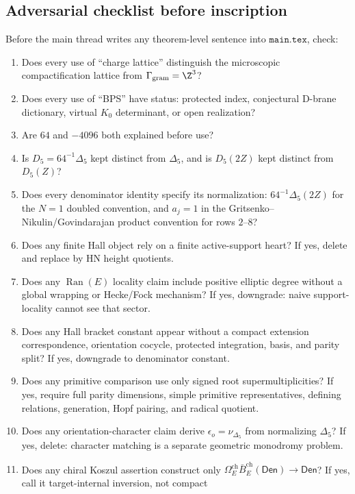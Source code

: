 \subsection{Adversarial checklist before inscription}

Before the main thread writes any theorem-level sentence into
\(\texttt{main.tex}\), check:
\begin{enumerate}
\item Does every use of ``charge lattice'' distinguish the microscopic
compactification lattice from \(\Gamma_{\mathrm{gram}}=\Z^3\)?
\item Does every use of ``BPS'' have status: protected index,
conjectural D-brane dictionary, virtual \(K_0\) determinant, or open
realization?
\item Are \(64\) and \(-4096\) both explained before use?
\item Is \(D_5=64^{-1}\Delta_5\) kept distinct from
\(\Delta_5\), and is \(D_5(2Z)\) kept distinct from \(D_5(Z)\)?
\item Does every denominator identity specify its normalization:
\(64^{-1}\Delta_5(2Z)\) for the \(N=1\) doubled convention, and
\(a_j=1\) in the Gritsenko--Nikulin/Govindarajan product convention for
rows \(2\)--\(8\)?
\item Does any finite Hall object rely on a finite active-support heart?
If yes, delete and replace by HN height quotients.
\item Does any \(\operatorname{Ran}(E)\) locality claim include positive
elliptic degree without a global wrapping or Hecke/Fock mechanism?  If
yes, downgrade: naive support-locality cannot see that sector.
\item Does any Hall bracket constant appear without a compact extension
correspondence, orientation cocycle, protected integration, basis, and
parity split?  If yes, downgrade to denominator constant.
\item Does any primitive comparison use only signed root
supermultiplicities?  If yes, require full parity dimensions, simple
primitive representatives, defining relations, generation, Hopf pairing,
and radical quotient.
\item Does any orientation-character claim derive
\(\epsilon_o=\nu_{\Delta_5}\) from normalizing \(\Delta_5\)?  If yes,
delete: character matching is a separate geometric monodromy problem.
\item Does any chiral Koszul assertion construct only
\(\Omega_E^{\mathrm{ch}}\bar B_E^{\mathrm{ch}}(\mathsf{Den})\to
\mathsf{Den}\)?  If yes, call it target-internal inversion, not compact

\end{enumerate}
